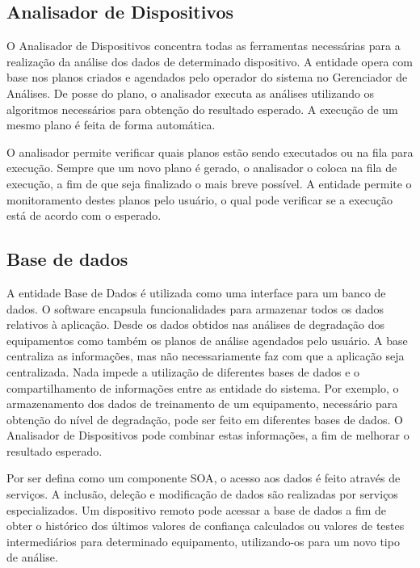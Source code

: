 \subsection{Analisador de Dispositivos}
\label{sub:proposta-analisador-dispositivos}

O Analisador de Dispositivos concentra todas as ferramentas necessárias para a realização da análise
dos dados de determinado dispositivo. A entidade opera com base nos planos criados e agendados pelo
operador do sistema no Gerenciador de Análises. De posse do plano, o analisador executa as análises
utilizando os algoritmos necessários para obtenção do resultado esperado. A execução de um mesmo
plano é feita de forma automática.

O analisador permite verificar quais planos estão sendo executados ou na fila para execução. Sempre
que um novo plano é gerado, o analisador o coloca na fila de execução, a fim de que seja
finalizado o mais breve possível. A entidade permite o monitoramento destes planos pelo usuário, o
qual pode verificar se a execução está de acordo com o esperado.


\subsection{Base de dados}
\label{sub:proposta-base-dados}

A entidade Base de Dados é utilizada como uma interface para um banco de dados. O software encapsula
funcionalidades para  armazenar todos os dados relativos à aplicação. Desde os dados obtidos nas
análises de degradação dos equipamentos como também os planos de análise agendados pelo usuário. A
base centraliza as informações, mas não necessariamente faz com que a aplicação seja centralizada.
Nada impede a utilização de diferentes bases de dados e o
compartilhamento de informações entre as entidade do sistema. Por exemplo, o armazenamento dos dados
de treinamento de um equipamento, necessário para obtenção do nível de degradação, pode ser feito em
diferentes bases de dados. O Analisador de Dispositivos pode combinar estas informações, a fim de
melhorar o resultado esperado.

Por ser defina como um componente \gls{SOA}, o acesso aos dados é feito através de serviços. A
inclusão, deleção e modificação de dados são realizadas por serviços especializados. Um dispositivo
remoto pode acessar a base de dados a fim de obter o histórico dos últimos valores de confiança
calculados ou valores de testes intermediários para determinado equipamento, utilizando-os para um
novo tipo de análise.



